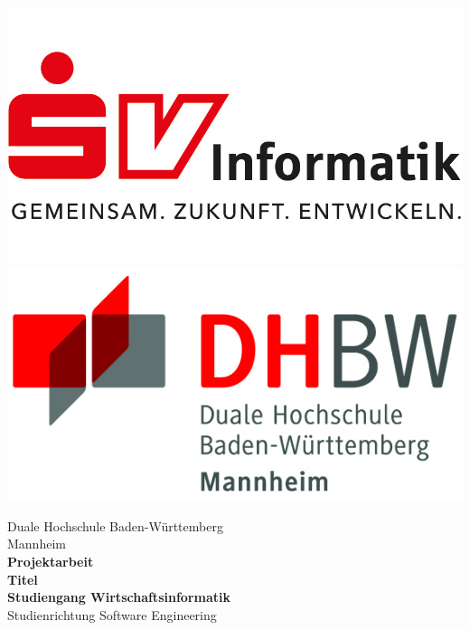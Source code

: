 \begin{titlepage}
	\begin{minipage}{\textwidth}
		\vspace{-2cm}
		\noindent \includegraphics[scale=0.71]{resource/SV-Inforamtik-Logo.jpg} \hfill   \includegraphics{resource/DHBW-Logo.jpg}
	\end{minipage}
	\vspace{1em}
	\sffamily
	\begin{center}
		\textsf{\large{}Duale Hochschule Baden-W\"urttemberg\\[1.5mm] Mannheim}\\[2em]
		\textsf{\textbf{\Large{}Projektarbeit}}\\[3mm]
		\textsf{\textbf{Titel}} \\[1.5cm]
		\textsf{\textbf{\Large{}Studiengang Wirtschaftsinformatik}\\[3mm] \textsf{Studienrichtung Software Engineering}}
		
		\vspace{3em}
		\vfill
		
		\begin{minipage}{\textwidth}
			

\end{minipage}
\end{center}
\end{titlepage}
